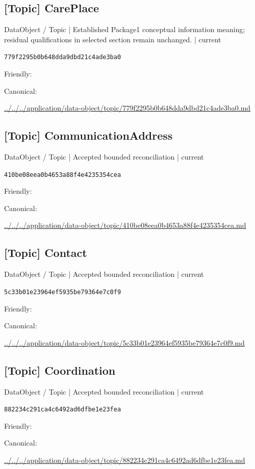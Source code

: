 \documentclass[10pt,a4paper]{article}
\begin{document}
\subsection*{[Topic] CarePlace}
{\small DataObject / Topic | Established Package1 conceptual information meaning; residual qualifications in selected section remain unchanged. | current}\par
\texttt{779f2295b0b648dda9dbd21c4ade3ba0}\par
Friendly: \par
Canonical: \par
{\footnotesize\url{../../../application/data-object/topic/779f2295b0b648dda9dbd21c4ade3ba0.md}}\par
\subsection*{[Topic] CommunicationAddress}
{\small DataObject / Topic | Accepted bounded reconciliation | current}\par
\texttt{410be08eea0b4653a88f4e4235354cea}\par
Friendly: \par
Canonical: \par
{\footnotesize\url{../../../application/data-object/topic/410be08eea0b4653a88f4e4235354cea.md}}\par
\subsection*{[Topic] Contact}
{\small DataObject / Topic | Accepted bounded reconciliation | current}\par
\texttt{5c33b01e23964ef5935be79364e7c0f9}\par
Friendly: \par
Canonical: \par
{\footnotesize\url{../../../application/data-object/topic/5c33b01e23964ef5935be79364e7c0f9.md}}\par
\subsection*{[Topic] Coordination}
{\small DataObject / Topic | Accepted bounded reconciliation | current}\par
\texttt{882234c291ca4c6492ad6dfbe1e23fea}\par
Friendly: \par
Canonical: \par
{\footnotesize\url{../../../application/data-object/topic/882234c291ca4c6492ad6dfbe1e23fea.md}}\par
\end{document}
